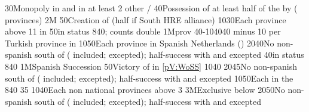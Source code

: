 %
%
{}{30}{Monopoly in  and in at least 2 other \CTZ/\STZ}%
%
%
%
{}{40}{Possession of at least half of the \payshongrie by \AUSaus (
  provinces)}%
%
\EUobjective2M{}{}%
{}{50}{Creation of  (half if South HRE alliance)}%
%
%
{10}{30}{Each province above 11 in \AUSaus}%
%
%
{}{50}{\paysportugal in \ANNEXION status}%
%
%
{8}{40}{\EUobjMonopolyZone;  counts double}%
%
%
\EUobjective1M{\payshongrie}{\TUR prov}%
{40-10}{40}{40 \VPs minus 10 \VPs per Turkish province in \payshongrie}%
%
%
{10}{50}{Each province in Spanish Netherlands (\regionBelgique)}%
%
%
{20}{40}{No non-spanish \COL south of 
  ( included;  excepted); half-success
  with  and  excepted}%
%
%
{}{40}{\paysportugal in \ANNEXION status}%
%
%
{8}{40}{\EUobjMonopolyZone}%
%
%
\EUobjective1M{Spanish Succession}{}%
{}{50}{Victory of \SPA in \ref{pV:WoSS}}%
%
%
{10}{40}{}%
%
%
{20}{45}{No non-spanish \COL south of 
  ( included;  excepted); half-success
  with  and  excepted}%
%
%
{10}{50}{Each \Presidio in the }%
%
%
{8}{40}{\EUobjMonopolyZone}%
%
%
%
{}{35}{}%
%
%
{10}{40}{Each non national provinces above 3}%
%
\EUobjective3M{Exclusive below }{}%
{20}{50}{No non-spanish \COL south of 
  ( included;  excepted); half-success
  with  and  excepted}%
%
%
